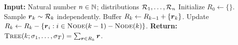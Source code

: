 \begin{algorithm}[!ht]
    \begin{algorithmic}[1]
        \Statex \textbf{Input:} Natural number $n\in\mathbb N$; distributions ${\cal R}_1,\ldots,{\cal R}_n$
        \State Initialize $R_0 \gets \{\}$.
            \State Sample ${\boldsymbol{r}}_k \sim {\cal R}_k$ independently.
            {\color{green}
            \State Buffer $R_k \gets R_{k-1} + \{{\boldsymbol{r}}_k\}$.
            \State Update $R_k \gets R_k - \{{\boldsymbol{r}}_i: i \in {\normalfont\textsc{Node}}(k-1)-{\normalfont\textsc{Node}}(k)\}$.
            }
        \EndFor
        \Statex \textbf{Return:} ${\normalfont\textsc{Tree}}(k;\sigma_1,\ldots,\sigma_T) = \sum_{{\boldsymbol{r}}\in R_k} {\boldsymbol{r}}$.
    \end{algorithmic}
    \caption{Practical Implementation of the {\tree} Mechanism}
    \label{alg:app:tree-practical}
\end{algorithm}